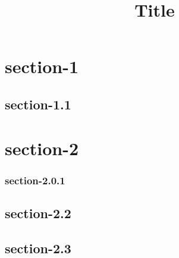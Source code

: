 \documentclass[11pt,a4paper]{article}
\title{Title}
\begin{document}
\maketitle

\section{section-1}

\subsection{section-1.1}

\section{section-2}

\subsubsection{section-2.0.1}

\subsection{section-2.2}

\subsection{section-2.3}
\end{document}
